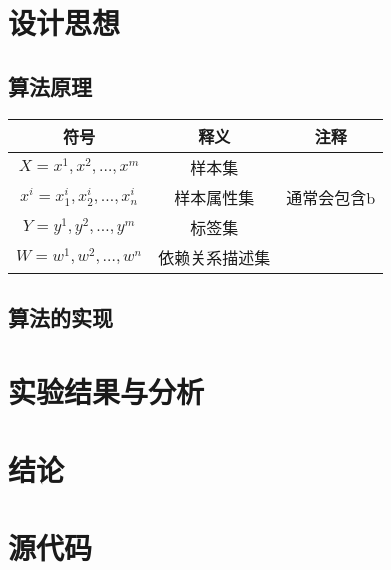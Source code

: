 \documentclass{ML}
\begin{document}
\section{设计思想}


\subsection{算法原理}

\begin{table}[H]
	\centering
	\begin{tabular}{ccc}
		\\ \hline
		符号                          & 释义           & 注释        \\ \hline
		\(X = x^{1},x^{2},…,x^{m}\)   & 样本集         &             \\
		\(x^i = x_1^i,x_2^i,…,x_n^i\) & 样本属性集     & 通常会包含b \\
		\(Y = y^{1},y^{2},…,y^{m}\)   & 标签集         &             \\
		\(W = w^{1},w^{2},…,w^{n}\)   & 依赖关系描述集 &
		\\ \hline
	\end{tabular}
\end{table}

\subsection{算法的实现}


\section{实验结果与分析}


\section{结论}



\appendix

\section{源代码}

\inputminted[breaklines=true,frame=lines,mathescape=true]{python}{../decision_tree.py}
\end{document}
